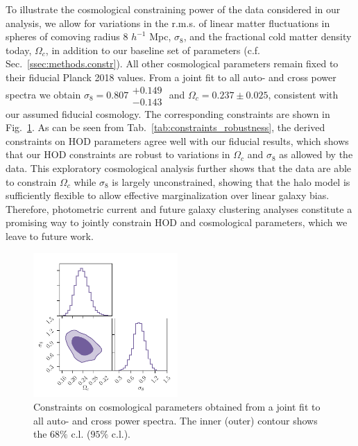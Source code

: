 \documentclass[a4paper,11pt]{article}
\begin{document}
    To illustrate the cosmological constraining power of the data considered in our analysis, we allow for variations in the r.m.s. of linear matter fluctuations in spheres of comoving radius 8 $h^{-1}$ Mpc, $\sigma_{8}$, and the fractional cold matter density today, $\Omega_{c}$, in addition to our baseline set of parameters (c.f. Sec.~\ref{ssec:methods.constr}). All other cosmological parameters remain fixed to their fiducial Planck 2018 values. From a joint fit to all auto- and cross power spectra we obtain $\sigma_{8} = 0.807\substack{+0.149 \\ -0.143}$ and $\Omega_{c} = 0.237 \pm 0.025$, consistent with our assumed fiducial cosmology. The corresponding constraints are shown in Fig.~\ref{fig:constraints-fit=Oc+s8}. As can be seen from Tab.~\ref{tab:constraints_robustness}, the derived constraints on HOD parameters agree well with our fiducial results, which shows that our HOD constraints are robust to variations in $\Omega_{c}$ and $\sigma_{8}$ as allowed by the data. This exploratory cosmological analysis further shows that the data are able to constrain $\Omega_{c}$ while $\sigma_{8}$ is largely unconstrained, showing that the halo model is sufficiently flexible to allow effective marginalization over linear galaxy bias. Therefore, photometric current and future galaxy clustering analyses constitute a promising way to jointly constrain HOD and cosmological parameters, which we leave to future work. 
 
    \begin{figure}
      \begin{center}
        \includegraphics[width=0.49\textwidth]{figures/contours-Oc-s8_mPk=HOD_fix=alpha-fc-sigmaM_HOD=zevol_fit=pz-shifts+prior=0p2-pz-widths+prior=0p2_fit=auto+cross_cosmo=const-LINBIAS_HOD-param=zfid_clfit=HOD-zevol_fit=Oc+s8.pdf}
        \caption{Constraints on cosmological parameters obtained from a joint fit to all auto- and cross power spectra. The inner (outer) contour shows the $68 \%$ c.l. ($95 \%$ c.l.).}
        \label{fig:constraints-fit=Oc+s8}
      \end{center}
    \end{figure} 
    
\end{document}
